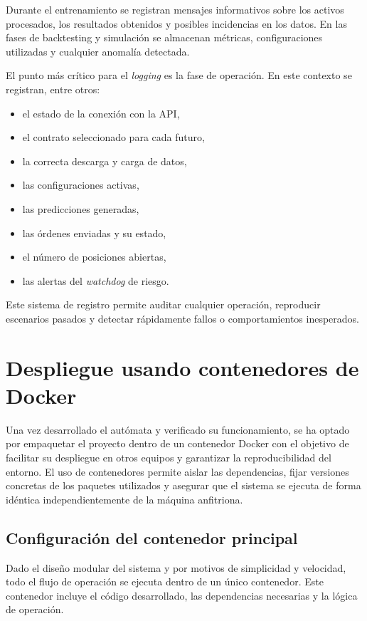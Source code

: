 Durante el entrenamiento se registran mensajes informativos sobre los activos procesados, los resultados obtenidos y posibles incidencias en los
datos. En las fases de backtesting y simulación se almacenan métricas, configuraciones utilizadas y cualquier anomalía detectada.

El punto más crítico para el \textit{logging} es la fase de operación. En este contexto se registran, entre otros:

\begin{itemize}
    \item el estado de la conexión con la API,
    \item el contrato seleccionado para cada futuro,
    \item la correcta descarga y carga de datos,
    \item las configuraciones activas,
    \item las predicciones generadas,
    \item las órdenes enviadas y su estado,
    \item el número de posiciones abiertas,
    \item las alertas del \textit{watchdog} de riesgo.
\end{itemize}

Este sistema de registro permite auditar cualquier operación, reproducir escenarios pasados y detectar rápidamente fallos o comportamientos
inesperados.
\section{Despliegue usando contenedores de Docker}

Una vez desarrollado el autómata y verificado su funcionamiento, se ha optado por empaquetar el proyecto dentro de un contenedor Docker con el
objetivo de facilitar su despliegue en otros equipos y garantizar la reproducibilidad del entorno. El uso de contenedores permite aislar las
dependencias, fijar versiones concretas de los paquetes utilizados y asegurar que el sistema se ejecuta de forma idéntica independientemente de la
máquina anfitriona.

\subsection{Configuración del contenedor principal}

Dado el diseño modular del sistema y por motivos de simplicidad y velocidad, todo el flujo de operación se ejecuta dentro de un único contenedor. Este
contenedor incluye el código desarrollado, las dependencias necesarias y la lógica de operación.

